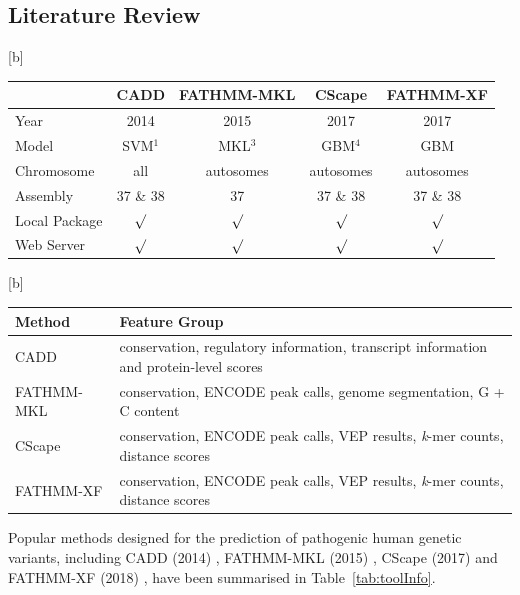 \documentclass[a4paper,nohyper,nobib,openany,justified]{tufte-book}
\makeatletter
\renewenvironment{table}[1][htbp]{%
  \@tufte@orig@float{table}[#1]%
}{%
  \@tufte@orig@endfloat
}
\makeatother
\begin{document}
\begin{fullwidth}
\chapter{Literature Review}

\begin{table}[b]
    \begin{tabular}{lcccc}\toprule
        & \textbf{CADD} & \textbf{FATHMM-MKL}  & \textbf{CScape}& \textbf{FATHMM-XF}  \\ \midrule
        Year & 2014 & 2015 & 2017 & 2017\\
        Model & SVM$^1$ & MKL$^3$ & GBM$^4$ & GBM \\
        Chromosome & all & autosomes & autosomes & autosomes\\
        Assembly & 37 \& 38 & 37 & 37 \& 38 & 37 \& 38 \\
        Local Package & ${\surd}$  & ${\surd}$ & ${\surd}$ & ${\surd}$\\
        Web Server & ${\surd}$ & ${\surd}$ & ${\surd}$ & ${\surd}$\\
        \bottomrule
    \end{tabular}
  \caption{Overview of several popular pathogenic SNV predictors.
}\label{tab:toolInfo}
\end{table}

\begin{table}[b]
    \begin{tabular}{p{3.2cm}p{12cm}}\toprule
      \textbf{Method} & \textbf{Feature Group} \\\midrule
        CADD & conservation, regulatory information, transcript information and protein-level scores\\
        FATHMM-MKL  & conservation, ENCODE peak calls, genome segmentation, G + C content\\
        CScape & conservation, ENCODE peak calls, VEP results, \emph{k}-mer counts, distance scores \\
        FATHMM-XF & conservation, ENCODE peak calls, VEP results, \emph{k}-mer counts, distance scores \\
        \bottomrule
    \end{tabular}
  \caption{Summary of feature groups used by popular tools.
}\label{tab:toolFea}
\end{table}

Popular methods designed for the prediction of pathogenic human genetic variants, including CADD (2014) \cite{Kircher2014}, FATHMM-MKL (2015) \cite{Shihab2015}, CScape (2017) \cite{Rogers2017} and FATHMM-XF (2018) \cite{Rogers2018}, have been summarised in Table~\ref{tab:toolInfo}.


\end{fullwidth}
\end{document}
